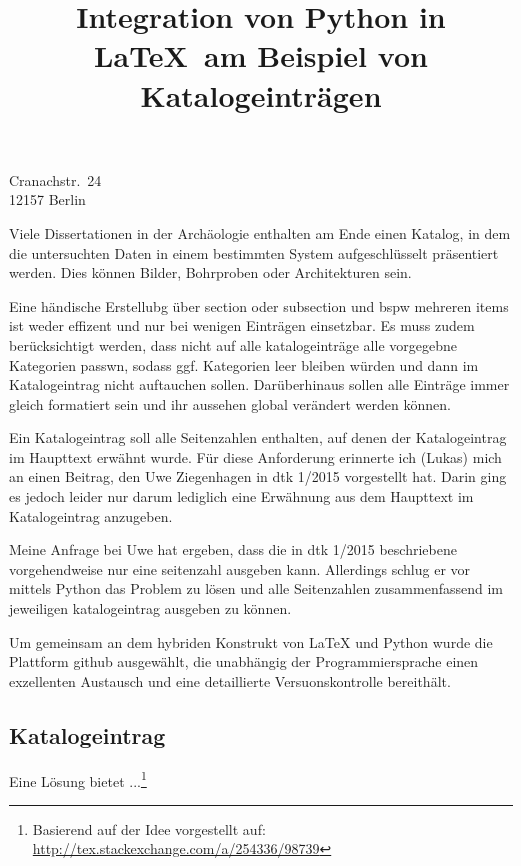 \documentclass[ngerman]{dtk}
\begin{document}
\title{Integration von Python in \LaTeX\ am Beispiel von Katalogeinträgen}
%
			{Cranachstr.~24\\
			12157 Berlin\\
			}
\maketitle



Viele Dissertationen in der Archäologie enthalten am Ende einen Katalog, 
in dem die untersuchten Daten in einem bestimmten System aufgeschlüsselt präsentiert werden.
Dies können Bilder, Bohrproben oder Architekturen sein.

Eine händische Erstellubg über section oder subsection und bspw mehreren items ist weder effizent und nur bei wenigen Einträgen einsetzbar.
Es muss zudem berücksichtigt werden, dass nicht auf alle katalogeinträge alle vorgegebne Kategorien passwn, sodass ggf. Kategorien leer bleiben würden und dann im Katalogeintrag nicht auftauchen sollen.
Darüberhinaus sollen alle Einträge immer gleich formatiert sein und ihr aussehen global verändert werden können.

Ein Katalogeintrag soll alle Seitenzahlen enthalten, auf denen der Katalogeintrag im Haupttext erwähnt wurde.
Für diese Anforderung erinnerte ich (Lukas) mich an einen Beitrag, den Uwe Ziegenhagen in dtk 1/2015 vorgestellt hat. 
Darin ging es jedoch leider nur darum lediglich eine Erwähnung aus dem Haupttext im Katalogeintrag anzugeben.

Meine Anfrage bei Uwe hat ergeben, dass die in dtk 1/2015 beschriebene vorgehendweise nur eine seitenzahl ausgeben kann.
Allerdings schlug er vor mittels Python das Problem zu lösen und alle Seitenzahlen zusammenfassend im jeweiligen katalogeintrag ausgeben zu können.

Um gemeinsam an dem hybriden Konstrukt von LaTeX und Python wurde die Plattform github ausgewählt, die unabhängig der Programmiersprache einen exzellenten Austausch und eine detaillierte Versuonskontrolle bereithält.


\subsection{Katalogeintrag}



Eine Lösung bietet ...\footnote{Basierend auf der Idee vorgestellt auf: \url{http://tex.stackexchange.com/a/254336/98739}}
\end{document}
